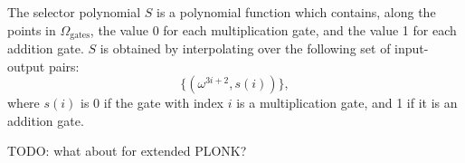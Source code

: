 \documentclass[11pt]{article}
\begin{document}
The selector polynomial $S$ is a polynomial function which contains, along the points in $\Omega_{\text{gates}}$,
the value 0 for each multiplication gate, and the value 1 for each addition gate. $S$ is obtained by
interpolating over the following set of input-output pairs:
\begin{equation}
	\{(\omega^{3i+2}, s(i))\},
\end{equation}
where $s(i)$ is 0 if the gate with index $i$ is a multiplication gate, and 1 if it is an addition gate.

TODO: what about for extended PLONK?
\end{document}
